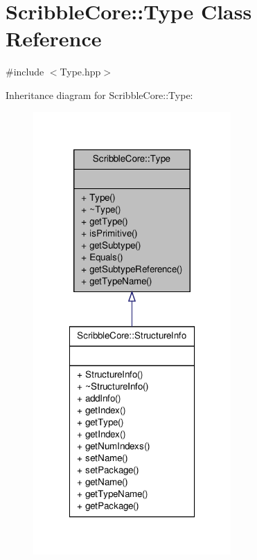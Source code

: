 \hypertarget{class_scribble_core_1_1_type}{\section{Scribble\-Core\-:\-:Type Class Reference}
\label{class_scribble_core_1_1_type}
}


{\ttfamily \#include $<$Type.\-hpp$>$}



Inheritance diagram for Scribble\-Core\-:\-:Type\-:
\nopagebreak
\begin{figure}[H]
\begin{center}
\leavevmode
\includegraphics[width=214pt]{class_scribble_core_1_1_type__inherit__graph}
\end{center}
\end{figure}


